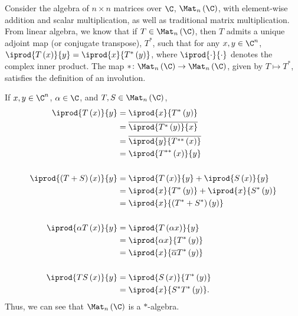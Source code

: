 \begin{example}
  Consider the algebra of $n\times n$ matrices over $\C$, $\Mat_n\left(\C\right)$, with element-wise addition and scalar multiplication, as well as traditional matrix multiplication. From linear algebra, we know that if $T\in \Mat_n\left(\C\right)$, then $T$ admits a unique adjoint map (or conjugate transpose), $T^{\ast}$, such that for any $x,y\in \C^n$, $ \iprod{T\left(x\right)}{y} =  \iprod{x}{T^{\ast}\left(y\right)}$, where $ \iprod{\cdot}{\cdot} $ denotes the complex inner product. The map $\ast\colon \Mat_n\left(\C\right)\rightarrow \Mat_n\left(\C\right)$, given by $T\mapsto T^{\ast}$, satisfies the definition of an involution.\newline

  If $x,y\in \C^n$, $\alpha\in\C$, and $T,S\in \Mat_n\left(\C\right)$,
  \begin{align*}
    \iprod{T\left(x\right)}{y} &= \iprod{x}{T^{\ast}\left(y\right)}\\
                               &= \overline{ \iprod{T^{\ast}\left(y\right)}{x} }\\
                               &= \overline{ \iprod{y}{T^{\ast\ast}\left(x\right)} }\\
                               &= \iprod{T^{\ast\ast}\left(x\right)}{y}\\
                               \\
    \iprod{\left(T+S\right)\left(x\right)}{y} &= \iprod{T\left(x\right)}{y} + \iprod{S\left(x\right)}{y}\\
                                              &= \iprod{x}{T^{\ast}\left(y\right)} + \iprod{x}{S^{\ast}\left(y\right)}\\
                                              &= \iprod{x}{\left(T^{\ast} + S^{\ast}\right)\left(y\right)}\\
                                              \\
    \iprod{\alpha T\left(x\right)}{y} &= \iprod{T\left(\alpha x\right)}{y}\\
                                      &= \iprod{\alpha x}{T^{\ast}\left(y\right)}\\
                                      &= \iprod{x}{\overline{\alpha}T^{\ast}\left(y\right)}\\
                                      \\
    \iprod{TS\left(x\right)}{y} &= \iprod{S\left(x\right)}{T^{\ast}\left(y\right)}\\
                                &= \iprod{x}{S^{\ast}T^{\ast}\left(y\right)}.
  \end{align*}
  Thus, we can see that $\Mat_n\left(\C\right)$ is a $\ast$-algebra.
\end{example}
